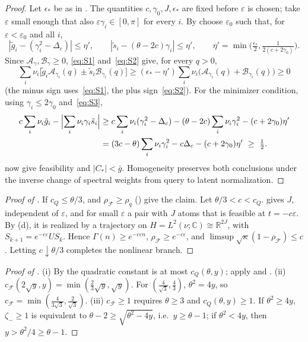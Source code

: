 \documentclass[11pt]{article}
\theoremstyle{definition}
\theoremstyle{remark}
\newcommand{\R}{\mathbb R}
\newcommand{\C}{\mathbb C}
\newcommand{\cF}{\mathcal F}
\newcommand{\cA}{\mathcal A}
\newcommand{\cB}{\mathcal B}
\newcommand{\rhoF}{\rho_{\cF}}
\newcommand{\cQ}{c_{Q}}
\newcommand{\cFF}{c_{\cF}}
\newcommand{\gt}{\tilde g}
\newcommand{\st}{\tilde s}
\begin{document}
\begin{proof}
Let \(\epsilon_*\) be as in .
The quantities \(c,\gamma_0,J,\epsilon_*\) are fixed before
\(\varepsilon\) is chosen; take \(\varepsilon\) small enough that also
\(\varepsilon\gamma_i\in[0,\pi]\) for every \(i\).
By  choose \(\varepsilon_0\) such that, for \(\varepsilon<\varepsilon_0\) and all \(i\),
\[
|\gt_i-(\gamma_i^2-\Delta_c)|\le\eta',\qquad |\st_i-(\theta-2c)\gamma_i|\le\eta',\qquad
\eta'=\min\bigl(\tfrac{\epsilon_*}2,\tfrac1{2(c+2\gamma_0)}\bigr).
\]
Since \(\cA_\gamma,\cB_\gamma\ge0\), \eqref{eq:S1} and~\eqref{eq:S2} give, for every \(q>0\),
\[
\sum_i\nu_i\bigl[\gt_i\cA_{\gamma_i}(q)\pm\st_i\cB_{\gamma_i}(q)\bigr]\ge(\epsilon_*-\eta')\sum_i\nu_i\bigl(\cA_{\gamma_i}(q)+\cB_{\gamma_i}(q)\bigr)\ge0
\]
(the minus sign uses~\eqref{eq:S1}, the plus sign~\eqref{eq:S2}).  For the minimizer
condition, using \(\gamma_i\le2\gamma_0\) and~\eqref{eq:S3},
\[
\begin{aligned}
c\sum_i\nu_i\gt_i-\Bigl|\sum_i\nu_i\gamma_i\st_i\Bigr|
&\ge c\sum_i\nu_i(\gamma_i^2-\Delta_c)-(\theta-2c)\sum_i\nu_i\gamma_i^2-(c+2\gamma_0)\eta'\\
&=(3c-\theta)\sum_i\nu_i\gamma_i^2-c\Delta_c-(c+2\gamma_0)\eta'\ \ge\ \tfrac12 .
\end{aligned}
\]
 now give feasibility and \(|C_*|<\bar g\).
Homogeneity preserves both conclusions under the inverse change of spectral
weights from query to latent normalization.
\end{proof}

\begin{proof}[Proof of ]
If \(\cQ\le\theta/3\),  and \(\rhoF\ge\rho_q\) () give the claim.  Let
\(\theta/3<c<\cQ\).   gives \(J\), independent of \(\varepsilon\), and for small \(\varepsilon\) a pair with \(J\) atoms that is
feasible at \(t=-c\varepsilon\).  By (d), it is realized by a trajectory on
\(H=L^2(\nu;\C)\cong\R^{2J}\), with \(S_{k+1}=e^{-c\varepsilon}US_k\).
Hence \(\Gamma(n)\ge e^{-c\varepsilon n}\), \(\rhoF\ge e^{-c\varepsilon}\), and
\(\limsup\sqrt\kappa(1-\rhoF)\le c\).
Letting \(c\downarrow\theta/3\) completes the nonlinear branch.
\end{proof}

\begin{proof}[Proof of ]
(i) By  the quadratic constant is at most \(\cQ(\theta,y)\); apply 
and .  (ii) \(\cFF(2\sqrt y,y)=\min(\frac23\sqrt y,\sqrt y)\).  For \((\frac4{\sqrt3},\frac43)\),
\(\theta^2=4y\), so \(\cFF=\min(\frac4{3\sqrt3},\frac2{\sqrt3})\).  (iii) \(\cFF\ge1\) requires \(\theta\ge3\) and \(\cQ(\theta,y)\ge1\).
If \(\theta^2\ge4y\), \(\zeta_-\ge1\) is equivalent to \(\theta-2\ge\sqrt{\theta^2-4y}\), i.e.\ \(y\ge\theta-1\); if \(\theta^2<4y\), then
\(y>\theta^2/4\ge\theta-1\).
\end{proof}
\end{document}
